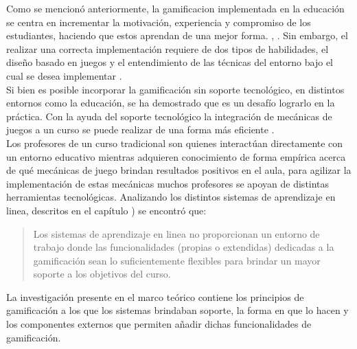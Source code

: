  Como se mencionó anteriormente, la \gls{gamificacion} implementada en la educación
 se centra en incrementar la motivación, experiencia y compromiso de los estudiantes,
 haciendo que estos aprendan de una mejor forma. \cite{GamInE-Learning}, \cite{Lee}.
 \noindent Sin embargo, el realizar una correcta implementación requiere de dos tipos
 de habilidades, el diseño basado en juegos y el entendimiento de las técnicas del
 entorno bajo el cual se desea implementar \cite[p. 7]{ForTheWin}.\\

 \noindent Si bien es posible incorporar la gamificación sin soporte tecnológico,
 en distintos entornos como la educación, se ha demostrado que es un desafío lograrlo
 en la práctica. Con la ayuda del soporte tecnológico la integración de mecánicas de
 juegos a un curso se puede realizar de una forma más eficiente
 \cite{Wood-Reiners}.\\

 \noindent Los profesores de un curso tradicional son quienes interactúan
 directamente con un entorno educativo mientras adquieren conocimiento de forma
 empírica acerca de qué mecánicas de juego brindan resultados positivos en el aula,
 para agilizar la implementación de estas mecánicas muchos profesores se apoyan de
 distintas herramientas tecnológicas. Analizando los distintos sistemas de
 aprendizaje en linea, descritos en el capítulo ) se
 encontró que:

    \begin{quote}
    \colorbox{blue!05}{\parbox{\dimexpr\linewidth-2\fboxsep}{\strut%
        Los sistemas de aprendizaje en linea no proporcionan un entorno
        de trabajo donde las funcionalidades (propias o extendidas) dedicadas
        a la gamificación sean lo suficientemente flexibles para brindar un
        mayor soporte a los objetivos del curso.
    \strut}}%
    \end{quote}

 \hfill \par
 \noindent La investigación presente en el marco teórico contiene los principios de
 gamificación a los que los sistemas brindaban soporte, la forma en que lo hacen y
 los componentes externos que permiten añadir dichas funcionalidades de gamificación.


